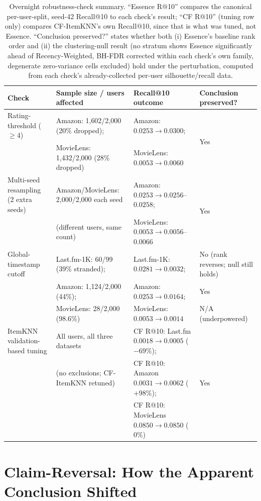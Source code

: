 \documentclass{article}
\begin{document}
\begin{table}[H]
\centering
\caption{Overnight robustness-check summary. ``Essence R@10'' compares the canonical per-user-split, seed-42 Recall@10 to each check's result; ``CF R@10'' (tuning row only) compares CF-ItemKNN's own Recall@10, since that is what was tuned, not Essence. ``Conclusion preserved?'' states whether both (i) Essence's baseline rank order and (ii) the clustering-null result (no stratum shows Essence significantly ahead of Recency-Weighted, BH-FDR corrected within each check's own family, degenerate zero-variance cells excluded) hold under the perturbation, computed from each check's already-collected per-user silhouette/recall data.}
\label{tab:robustness}
\small
\begin{tabular}{llll}
\toprule
\textbf{Check} & \textbf{Sample size / users affected} & \textbf{Recall@10 outcome} & \textbf{Conclusion preserved?} \\
\midrule
Rating-threshold ($\geq 4$) & Amazon: 1{,}602/2{,}000 (20\% dropped); & Amazon: $0.0253\to0.0300$; & \multirow{2}{*}{Yes} \\
 & MovieLens: 1{,}432/2{,}000 (28\% dropped) & MovieLens: $0.0053\to0.0060$ & \\
\midrule
Multi-seed resampling (2 extra seeds) & Amazon/MovieLens: 2{,}000/2{,}000 each seed & Amazon: $0.0253\to0.0256$--$0.0258$; & \multirow{2}{*}{Yes} \\
 & (different users, same count) & MovieLens: $0.0053\to0.0056$--$0.0066$ & \\
\midrule
Global-timestamp cutoff & Last.fm-1K: 60/99 (39\% stranded); & Last.fm-1K: $0.0281\to0.0032$; & No (rank reverses; null still holds) \\
 & Amazon: 1{,}124/2{,}000 (44\%); & Amazon: $0.0253\to0.0164$; & Yes \\
 & MovieLens: 28/2{,}000 (98.6\%) & MovieLens: $0.0053\to0.0014$ & N/A (underpowered) \\
\midrule
ItemKNN validation-based tuning & All users, all three datasets & CF R@10: Last.fm $0.0018\to0.0005$ ($-69\%$); & \multirow{3}{*}{Yes} \\
 & (no exclusions; CF-ItemKNN retuned) & CF R@10: Amazon $0.0031\to0.0062$ ($+98\%$); & \\
 & & CF R@10: MovieLens $0.0850\to0.0850$ ($0\%$) & \\
\bottomrule
\end{tabular}
\end{table}

\section{Claim-Reversal: How the Apparent Conclusion Shifted}
\label{app:claimreversal}
\end{document}
